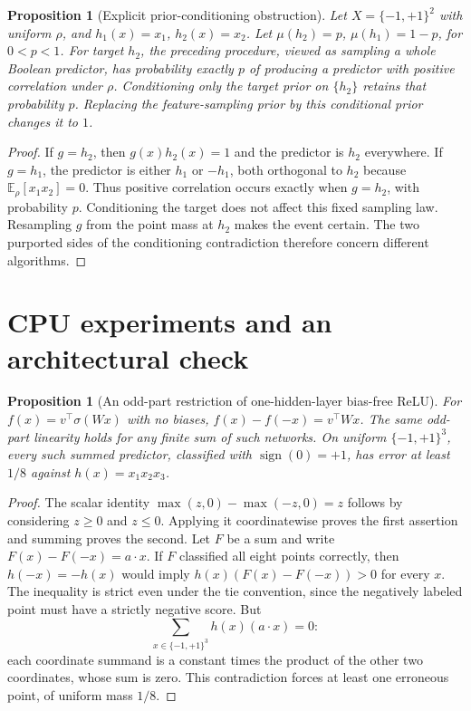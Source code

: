 \documentclass[11pt]{article}
\newtheorem{proposition}[theorem]{Proposition}
\DeclareMathOperator{\sign}{sign}
\newcommand{\E}{\mathbb E}
\newcommand{\1}{\mathbf 1}
\begin{document}
\begin{proposition}[Explicit prior-conditioning obstruction]\label{thm:conditioning}
Let $X=\{-1,+1\}^2$ with uniform $\rho$, and $h_1(x)=x_1$, $h_2(x)=x_2$. Let $\mu(h_2)=p$, $\mu(h_1)=1-p$, for $0<p<1$. For target $h_2$, the preceding procedure, viewed as sampling a whole Boolean predictor, has probability exactly $p$ of producing a predictor with positive correlation under $\rho$. Conditioning only the target prior on $\{h_2\}$ retains that probability $p$. Replacing the feature-sampling prior by this conditional prior changes it to $1$.
\end{proposition}
\begin{proof}
If $g=h_2$, then $g(x)h_2(x)=1$ and the predictor is $h_2$ everywhere. If $g=h_1$, the predictor is either $h_1$ or $-h_1$, both orthogonal to $h_2$ because
$\E_\rho[x_1x_2]=0$. Thus positive correlation occurs exactly when $g=h_2$, with probability $p$. Conditioning the target does not affect this fixed sampling law. Resampling $g$ from the point mass at $h_2$ makes the event certain. The two purported sides of the conditioning contradiction therefore concern different algorithms.
\end{proof}

\section{CPU experiments and an architectural check}
\begin{proposition}[An odd-part restriction of one-hidden-layer bias-free ReLU]\label{thm:odd}
For $f(x)=v^\top\sigma(Wx)$ with no biases, $f(x)-f(-x)=v^\top Wx$. The same odd-part linearity holds for any finite sum of such networks. On uniform $\{-1,+1\}^3$, every such summed predictor, classified with $\sign(0)=+1$, has error at least $1/8$ against $h(x)=x_1x_2x_3$.
\end{proposition}
\begin{proof}
The scalar identity $\max(z,0)-\max(-z,0)=z$ follows by considering $z\geq0$ and $z\leq0$. Applying it coordinatewise proves the first assertion and summing proves the second. Let $F$ be a sum and write $F(x)-F(-x)=a\cdot x$. If $F$ classified all eight points correctly, then $h(-x)=-h(x)$ would imply
$h(x)(F(x)-F(-x))>0$ for every $x$. The inequality is strict even under the tie convention, since the negatively labeled point must have a strictly negative score. But
\[
 \sum_{x\in\{-1,+1\}^3}h(x)(a\cdot x)=0:
\]
each coordinate summand is a constant times the product of the other two coordinates, whose sum is zero. This contradiction forces at least one erroneous point, of uniform mass $1/8$.
\end{proof}
\end{document}
